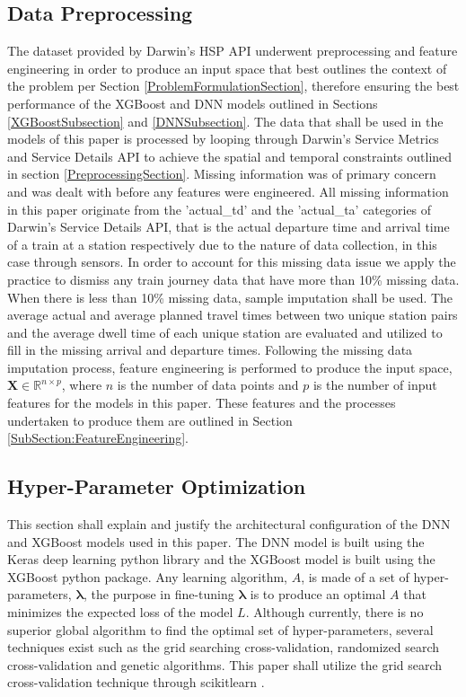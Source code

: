 \documentclass[]{interact}
\theoremstyle{plain}%
\theoremstyle{definition}
\theoremstyle{remark}
\begin{document}
\subsection{Data Preprocessing}
The dataset provided by Darwin's HSP API underwent preprocessing and feature engineering in order to produce an input space that best outlines the context of the problem per Section \ref{ProblemFormulationSection}, therefore ensuring the best performance of the XGBoost and DNN models outlined in Sections \ref{XGBoostSubsection} and \ref{DNNSubsection}. 
The data that shall be used in the models of this paper is processed by looping through Darwin's Service Metrics and Service Details API to achieve the spatial and temporal constraints outlined in section \ref{PreprocessingSection}. Missing information was of primary concern and was dealt with before any features were engineered. All missing information in this paper originate from the 'actual\_td' and the 'actual\_ta' categories of Darwin's Service Details API, that is the actual departure time and arrival time of a train at a station respectively due to the nature of data collection, in this case through sensors. In order to account for this missing data issue we apply the practice to dismiss any train journey data that have more than 10\% missing data.  
When there is less than 10\% missing data, sample imputation shall be used. The average actual and average planned travel times between two unique station pairs and the average dwell time of each unique station are evaluated and utilized to fill in the missing arrival and departure times. Following the missing data imputation process, feature engineering is performed to produce the input space, $\boldsymbol{X} \in \mathbb{R}^{n \times p}$, where $n$ is the number of data points and $p$ is the number of input features for the models in this paper. These features and the processes undertaken to produce them are outlined in Section \ref{SubSection:FeatureEngineering}.

\subsection{Hyper-Parameter Optimization}
This section shall explain and justify the architectural configuration of the DNN and XGBoost models used in this paper. The DNN model is built using the Keras deep learning python library \citep{chollet2015keras} and the XGBoost model is built using the XGBoost python package. Any learning algorithm, $A$, is made of a set of hyper-parameters, $\boldsymbol{\lambda}$, the purpose in fine-tuning $\boldsymbol{\lambda}$ is to produce an optimal $A$ that minimizes the expected loss of the model $L$. Although currently, there is no superior global algorithm to find the optimal set of hyper-parameters, several techniques exist such as the grid searching cross-validation, randomized search cross-validation and genetic algorithms. This paper shall utilize the grid search cross-validation technique through scikitlearn \citep{scikit-learn}. 
\end{document}
